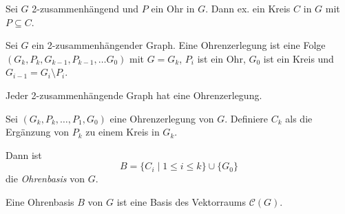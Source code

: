 \begin{proposition}
    Sei $ G $ 2-zusammenhängend und $ P $ ein Ohr in $ G $.
    Dann ex. ein Kreis $ C $ in $ G $ mit $ P \subseteq C $.
\end{proposition}

\begin{definition}[Ohrenzerlegung]
    Sei $ G $ ein 2-zusammenhängender Graph.
    Eine Ohrenzerlegung ist eine Folge $ (G_k, P_k, G_{k - 1}, P_{k - 1}, \dots G_0) $ mit $ G = G_k $, $ P_i $ ist ein Ohr, $ G_0 $ ist ein Kreis und $ G_{i - 1} = G_i \setminus P_i $.
\end{definition}

\begin{proposition}
    Jeder 2-zusammenhängende Graph hat eine Ohrenzerlegung.
\end{proposition}

\begin{definition}[Ohrenbasis]
    Sei $ (G_k, P_k, \dots, P_1, G_0) $ eine Ohrenzerlegung von $ G $.
    Definiere $ C_k $ als die Ergänzung von $ P_k $ zu einem Kreis in $ G_k $.

    Dann ist
    \begin{equation*}
        B = \{ C_i \mid 1 \leq i \leq k \} \cup \{ G_0 \}
    \end{equation*}
    die \textit{Ohrenbasis} von $ G $.
\end{definition}

\begin{theorem}
    Eine Ohrenbasis $ B $ von $ G $ ist eine Basis des Vektorraums $ \mathcal{C}(G) $.
\end{theorem}

